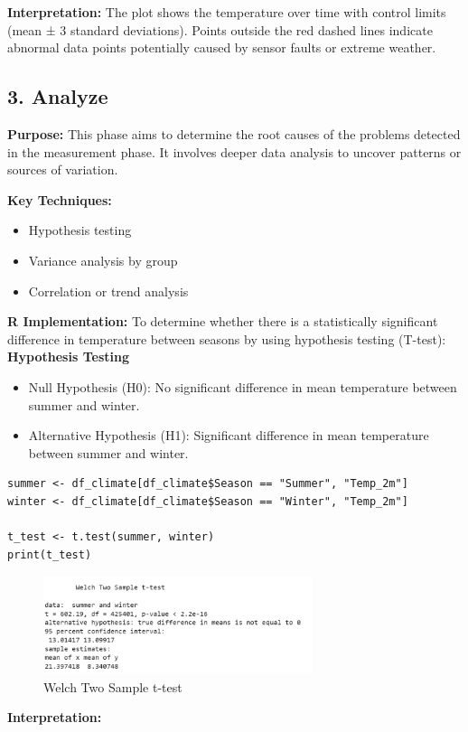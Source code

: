 \textbf{Interpretation:} The plot shows the temperature over time with control limits (mean ± 3 standard deviations). Points outside the red dashed lines indicate abnormal data points potentially caused by sensor faults or extreme weather.

\subsection*{3. Analyze}

\textbf{Purpose:} This phase aims to determine the root causes of the problems detected in the measurement phase. It involves deeper data analysis to uncover patterns or sources of variation.

\textbf{Key Techniques:}
\begin{itemize}
  \item Hypothesis testing
  \item Variance analysis by group
  \item Correlation or trend analysis
\end{itemize}

\textbf{R Implementation:} To determine whether there is a statistically significant difference in temperature between seasons by using hypothesis testing (T-test):\\

\textbf{Hypothesis Testing}
\begin{itemize}
  \item Null Hypothesis (H0): No significant difference in mean temperature between summer and winter.
  \item Alternative Hypothesis (H1): Significant difference in mean temperature between summer and winter.
\end{itemize}

\begin{verbatim}
summer <- df_climate[df_climate$Season == "Summer", "Temp_2m"]
winter <- df_climate[df_climate$Season == "Winter", "Temp_2m"]

t_test <- t.test(summer, winter)
print(t_test)
\end{verbatim}

\begin{figure}[h]
\centering
\includegraphics[width=0.7\textwidth]{figures/welch.png}
\caption{Welch Two Sample t-test}
\end{figure}
\textbf{Interpretation:}

